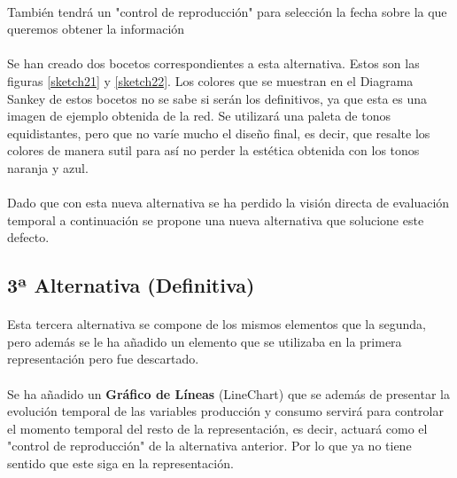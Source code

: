 \documentclass[11pt,spanish]{article}
\begin{document}
				\paragraph{}
				También tendrá un "control de reproducción" para selección la fecha sobre la que queremos obtener la información
				
				\paragraph{}
				Se han creado dos bocetos correspondientes a esta alternativa. Estos son las figuras \ref{sketch21} y \ref{sketch22}.  Los colores que se muestran en el Diagrama Sankey de estos bocetos no se sabe si serán los definitivos, ya que esta es una imagen de ejemplo obtenida de la red. Se utilizará una paleta de tonos equidistantes, pero que no varíe mucho el diseño final, es decir, que resalte los colores de manera sutil para así no perder la estética obtenida con los tonos naranja y azul.
				
				\paragraph{}
				Dado que con esta nueva alternativa se ha perdido la visión directa de evaluación temporal a continuación se propone una nueva alternativa que solucione este defecto.

		\subsection{3ª Alternativa (Definitiva)}

			\paragraph{}
			Esta tercera alternativa se compone de los mismos elementos que la segunda, pero además se le ha añadido un elemento que se utilizaba en la primera representación pero fue descartado. 
			
			\paragraph{}
			Se ha añadido un  {\bf Gráfico de Líneas} (LineChart) que se además de presentar la evolución temporal de las variables producción y consumo servirá para controlar el momento temporal del resto de la representación, es decir, actuará como el "control de reproducción" de la alternativa anterior. Por lo que ya no tiene sentido que este siga en la representación. 
\end{document}
